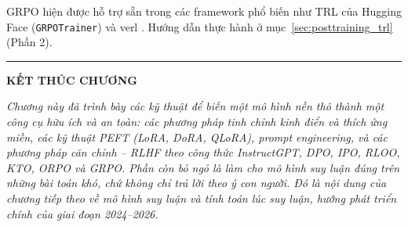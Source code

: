 GRPO hiện được hỗ trợ sẵn trong các framework phổ biến như TRL của Hugging Face (\texttt{GRPOTrainer}) và verl \cite{sheng2024hybridflow}. Hướng dẫn thực hành ở mục~\ref{sec:posttraining_trl} (Phần 2).

\bigskip
\hrule
\bigskip

\begin{center}
    \textbf{\Large KẾT THÚC CHƯƠNG \thechapter}
\end{center}

\textit{Chương này đã trình bày các kỹ thuật để biến một mô hình nền thô thành một công cụ hữu ích và an toàn: các phương pháp tinh chỉnh kinh điển và thích ứng miền, các kỹ thuật PEFT (LoRA, DoRA, QLoRA), prompt engineering, và các phương pháp căn chỉnh -- RLHF theo công thức InstructGPT, DPO, IPO, RLOO, KTO, ORPO và GRPO. Phần còn bỏ ngỏ là làm cho mô hình \emph{suy luận đúng} trên những bài toán khó, chứ không chỉ \emph{trả lời theo ý con người}. Đó là nội dung của chương tiếp theo về mô hình suy luận và tính toán lúc suy luận, hướng phát triển chính của giai đoạn 2024--2026.}
